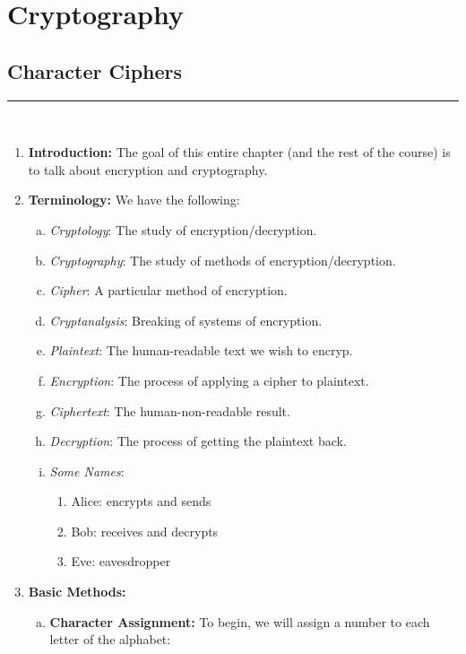 \documentclass[class=article, crop=false]{standalone}
\begin{document}
\setcounter{section}{7}
\section{Cryptography}

\subsection{Character Ciphers}
\rule{\textwidth}{1pt}\\
\begin{enumerate}
	\item \textbf{Introduction:} The goal of this entire chapter (and the rest of the course) is
	to talk about encryption and cryptography.

	\item \textbf{Terminology:} We have the following:
	\begin{enumerate}[(a)]
		\item \textit{Cryptology}: The study of encryption/decryption.
		\item \textit{Cryptography}: The study of methods of encryption/decryption.
		\item \textit{Cipher}: A particular method of encryption.
		\item \textit{Cryptanalysis}: Breaking of systems of encryption.
		\item \textit{Plaintext}: The human-readable text we wish to encryp.
		\item \textit{Encryption}: The process of applying a cipher to plaintext.
		\item \textit{Ciphertext}: The human-non-readable result.
		\item \textit{Decryption}: The process of getting the plaintext back.
		\item \textit{Some Names}:
		\begin{enumerate}
			\item Alice: encrypts and sends
			\item Bob: receives and decrypts
			\item Eve: eavesdropper
		\end{enumerate}
	\end{enumerate}

	\item \textbf{Basic Methods:}
	\begin{enumerate}[(a)]
		\item \textbf{Character Assignment:} To begin, we will assign a number to each letter of
		the alphabet:
		\begin{table}[h!]
			\centering
		\end{table}


\end{enumerate}
\end{enumerate}
\end{document}
